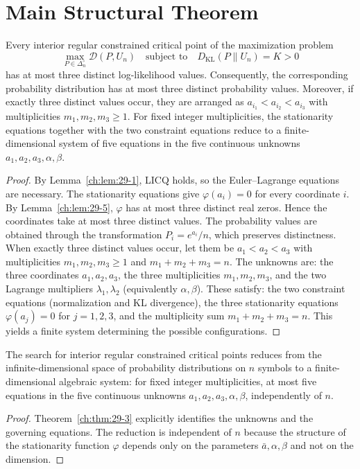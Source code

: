 \section{Main Structural Theorem}\label{ch:sec:main-structural-theorem}
\begin{theorem}
\label{ch:thm:29-3}
Every interior regular constrained critical point of the maximization problem
\[
\max_{P\in\Delta_n^\circ}\mathcal D(P,U_n)\quad\text{subject to}\quad D_{\mathrm{KL}}(P\|U_n)=K>0
\]
has at most three distinct log-likelihood values. Consequently, the corresponding probability distribution has at most three distinct probability values.
Moreover, if exactly three distinct values occur, they are arranged as \(a_{i_1}<a_{i_2}<a_{i_3}\) with multiplicities \(m_1,m_2,m_3\ge1\). For fixed integer multiplicities, the stationarity equations together with the two constraint equations reduce to a finite-dimensional system of five equations in the five continuous unknowns \(a_1,a_2,a_3,\alpha,\beta\).
\end{theorem}
\begin{proof}
By Lemma~\ref{ch:lem:29-1}, LICQ holds, so the Euler--Lagrange equations are necessary. The stationarity equations give \(\varphi(a_i)=0\) for every coordinate \(i\). By Lemma~\ref{ch:lem:29-5}, \(\varphi\) has at most three distinct real zeros. Hence the coordinates take at most three distinct values.
The probability values are obtained through the transformation \(P_i=e^{a_i}/n\), which preserves distinctness.
When exactly three distinct values occur, let them be \(a_1<a_2<a_3\) with multiplicities \(m_1,m_2,m_3\ge1\) and \(m_1+m_2+m_3=n\). The unknowns are: the three coordinates \(a_1,a_2,a_3\), the three multiplicities \(m_1,m_2,m_3\), and the two Lagrange multipliers \(\lambda_1,\lambda_2\) (equivalently \(\alpha,\beta\)). These satisfy: the two constraint equations (normalization and KL divergence), the three stationarity equations \(\varphi(a_j)=0\) for \(j=1,2,3\), and the multiplicity sum \(m_1+m_2+m_3=n\). This yields a finite system determining the possible configurations. 
\end{proof}
\begin{corollary}
\label{ch:cor:29-2}
The search for interior regular constrained critical points reduces from the infinite-dimensional space of probability distributions on \(n\) symbols to a finite-dimensional algebraic system: for fixed integer multiplicities, at most five equations in the five continuous unknowns \(a_1,a_2,a_3,\alpha,\beta\), independently of \(n\).
\end{corollary}
\begin{proof}
Theorem~\ref{ch:thm:29-3} explicitly identifies the unknowns and the governing equations. The reduction is independent of \(n\) because the structure of the stationarity function \(\varphi\) depends only on the parameters \(\bar a,\alpha,\beta\) and not on the dimension. 
\end{proof}
